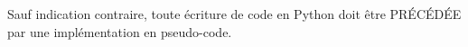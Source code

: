

Sauf indication contraire, toute écriture de code en Python doit être PR\'EC\'ED\'EE par une implémentation en pseudo-code.


